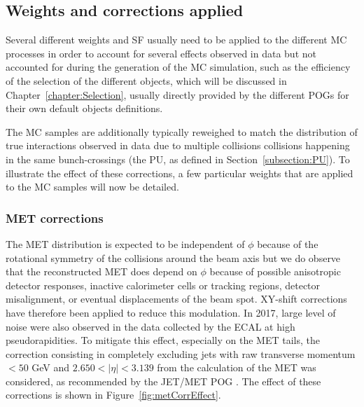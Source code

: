\documentclass[a4paper, 10pt, openright]{report}
\begin{document}
\subsection{Weights and corrections applied} \label{subsection:Weights}

Several different weights and \ac{SF} usually need to be applied to the different \ac{MC} processes in order to account for several effects observed in data but not accounted for during the generation of the \ac{MC} simulation, such as the efficiency of the selection of the different objects, which will be discussed in Chapter~\ref{chapter:Selection}, usually directly provided by the different \acfp{POG} for their own default objects definitions.

The \ac{MC} samples are additionally typically reweighed to match the distribution of true interactions observed in data due to multiple collisions collisions happening in the same bunch-crossings (the \ac{PU}, as defined in Section~\ref{subsection:PU}). To illustrate the effect of these corrections, a few particular weights that are applied to the \ac{MC} samples will now be detailed. 

\subsubsection{\ac{MET} corrections}

The \ac{MET} distribution is expected to be independent of $\phi$ because of the rotational symmetry of the collisions around the beam axis but we do observe that the reconstructed \ac{MET} does depend on $\phi$ because of possible anisotropic detector responses, inactive calorimeter cells or tracking regions, detector misalignment, or eventual displacements of the beam spot. XY-shift corrections have therefore been applied to reduce this modulation. In 2017, large level of noise were also observed in the data collected by the \ac{ECAL} at high pseudorapidities. To mitigate this effect, especially on the \ac{MET} tails, the correction consisting in completely excluding jets with raw transverse momentum $< 50$ GeV and $2.650 < |\eta| < 3.139$ from the calculation of the \ac{MET} was considered, as recommended by the JET/MET \ac{POG} \cite{EENoise}. The effect of these corrections is shown in Figure~\ref{fig:metCorrEffect}.
\end{document}

